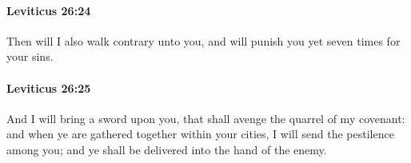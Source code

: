 		\paragraph{Leviticus 26:24} %
			\label{LEVITICUS-26-24}

			Then will I also walk contrary unto you, and will punish you yet seven times for your sins.


		\paragraph{Leviticus 26:25} %
			\label{LEVITICUS-26-25}

			And I will bring a sword upon you, that shall avenge the quarrel of my covenant: and when ye are gathered together within your cities, I will send the pestilence among you; and ye shall be delivered into the hand of the enemy.


